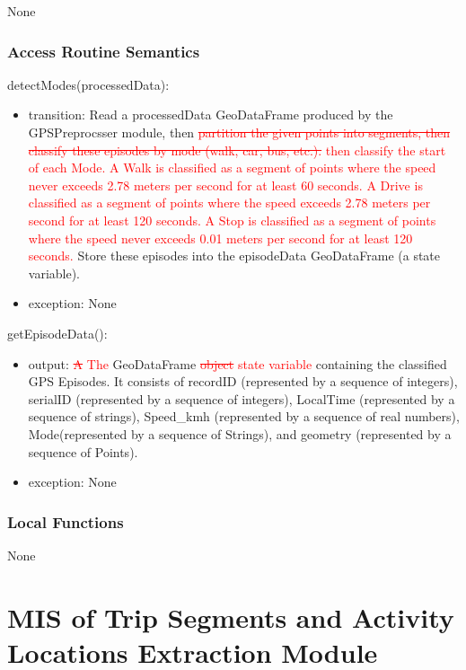 \documentclass[12pt, titlepage]{article}
\begin{document}
None

\subsubsection{Access Routine Semantics}

\noindent detectModes(processedData):
\begin{itemize}
\item transition: Read a processedData GeoDataFrame produced by the GPSPreprocsser module, then \textcolor{red}{\sout{partition the given points into segments, then classify these episodes by mode (walk, car, bus, etc.).} then classify the start of each Mode. A Walk is classified as a segment of points where the speed never exceeds 2.78 meters per second for at least 60 seconds. A Drive is classified as a segment of points where the speed exceeds 2.78 meters per second for at least 120 seconds. A Stop is classified as a segment of points where the speed never exceeds 0.01 meters per second for at least 120 seconds.} Store these episodes into the episodeData GeoDataFrame (a state variable).
\item exception: None
\end{itemize}

\noindent getEpisodeData():
\begin{itemize}

\item output: \textcolor{red}{\sout{A} The} GeoDataFrame \textcolor{red}{\sout{object} state variable} containing the classified GPS Episodes. It consists of recordID (represented by a sequence of integers), serialID (represented by a sequence of integers), LocalTime (represented by a sequence of strings), Speed\_kmh (represented by a sequence of real numbers), Mode(represented by a sequence of Strings), and geometry (represented by a sequence of Points).
\item exception: None
\end{itemize}

\subsubsection{Local Functions}

None
  
\newpage

\section{MIS of Trip Segments and Activity Locations Extraction Module} \label{Extractor} 
\end{document}
